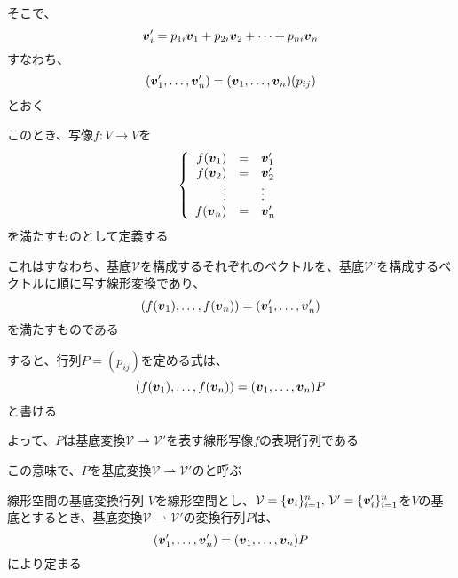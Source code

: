 \documentclass[../../../topic_linear-algebra]{subfiles}
\begin{document}
そこで、
\begin{equation*}
  \vb*{v}'_i = p_{1i} \vb*{v}_1 + p_{2i} \vb*{v}_2 + \cdots + p_{ni} \vb*{v}_n
\end{equation*}
すなわち、
\begin{equation*}
  (\vb*{v}'_1, \ldots, \vb*{v}'_n) = (\vb*{v}_1, \ldots, \vb*{v}_n) (p_{ij})
\end{equation*}
とおく

\br

このとき、写像$f\colon V \to V$を
\begin{equation*}
  \left\{
  \begin{array}{rcl}
    f(\vb*{v}_1) & = & \vb*{v}'_1 \\
    f(\vb*{v}_2) & = & \vb*{v}'_2 \\
    \vdots       &   & \vdots     \\
    f(\vb*{v}_n) & = & \vb*{v}'_n
  \end{array}
  \right.
\end{equation*}
を満たすものとして定義する

これはすなわち、基底$\mathcal{V}$を構成するそれぞれのベクトルを、基底$\mathcal{V}'$を構成するベクトルに順に写す線形変換であり、
\begin{equation*}
  (f(\vb*{v}_1), \ldots, f(\vb*{v}_n) ) = (\vb*{v}'_1, \ldots, \vb*{v}'_n)
\end{equation*}
を満たすものである

\br

すると、行列$P = (p_{ij})$を定める式は、
\begin{equation*}
  (f(\vb*{v}_1), \ldots, f(\vb*{v}_n)) = (\vb*{v}_1, \ldots, \vb*{v}_n) P
\end{equation*}
と書ける

よって、$P$は基底変換$\mathcal{V} \rightharpoonup \mathcal{V}'$を表す線形写像$f$の表現行列である

この意味で、$P$を基底変換$\mathcal{V} \rightharpoonup \mathcal{V}'$のと呼ぶ

\begin{theorem*}{線形空間の基底変換行列}
  $V$を線形空間とし、$\mathcal{V} = \{\vb*{v}_i\}_{i=1}^n,\, \mathcal{V}' = \{\vb*{v}'_i\}_{i=1}^n$を$V$の基底とするとき、基底変換$\mathcal{V} \rightharpoonup \mathcal{V}'$の変換行列$P$は、
  \begin{equation*}
    (\vb*{v}'_1, \ldots, \vb*{v}'_n) = (\vb*{v}_1, \ldots, \vb*{v}_n) P
  \end{equation*}
  により定まる
\end{theorem*}
\end{document}
